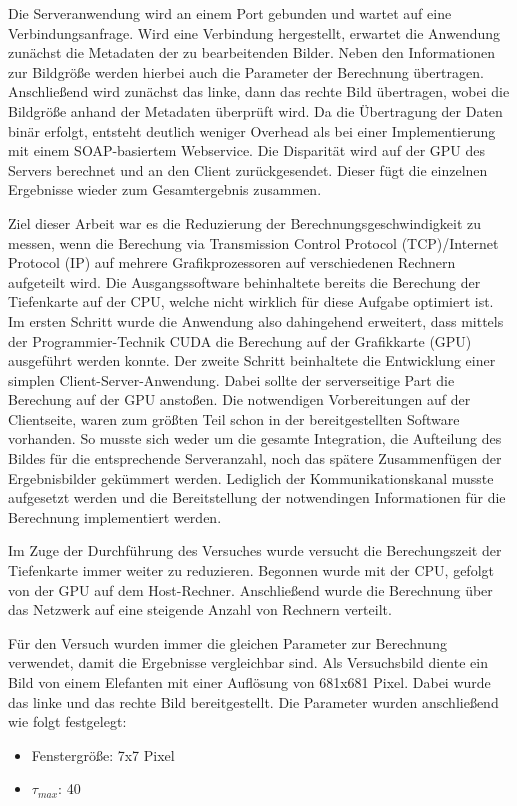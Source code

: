 \documentclass[times, 10pt,twocolumn]{article}
\begin{document}
Die Serveranwendung wird an einem Port gebunden und wartet auf eine Verbindungsanfrage. Wird eine Verbindung hergestellt, erwartet die Anwendung zunächst die Metadaten der zu bearbeitenden Bilder. Neben den Informationen zur Bildgröße werden hierbei auch die Parameter der Berechnung übertragen. Anschließend wird zunächst das linke, dann das rechte Bild übertragen, wobei die Bildgröße anhand der Metadaten überprüft wird. Da die Übertragung der Daten binär erfolgt, entsteht deutlich weniger Overhead als bei einer Implementierung mit einem SOAP-basiertem Webservice. Die Disparität wird auf der GPU des Servers berechnet und an den Client zurückgesendet. Dieser fügt die einzelnen Ergebnisse wieder zum Gesamtergebnis zusammen.



Ziel dieser Arbeit war es die Reduzierung der Berechnungsgeschwindigkeit zu messen, wenn die Berechung via Transmission Control Protocol (TCP)/Internet Protocol (IP) auf mehrere Grafikprozessoren auf verschiedenen Rechnern aufgeteilt wird.
Die Ausgangssoftware behinhaltete bereits die Berechung der Tiefenkarte auf der CPU, welche nicht wirklich für diese Aufgabe optimiert ist. Im ersten Schritt wurde die Anwendung also dahingehend erweitert, dass mittels der Programmier-Technik CUDA die Berechung auf der Grafikkarte (GPU) ausgeführt werden konnte.
Der zweite Schritt beinhaltete die Entwicklung einer simplen Client-Server-Anwendung. Dabei sollte der serverseitige Part die Berechung auf der GPU anstoßen. Die notwendigen Vorbereitungen auf der Clientseite, waren zum größten Teil schon in der bereitgestellten Software vorhanden. So musste sich weder um die gesamte Integration, die Aufteilung des Bildes für die entsprechende Serveranzahl, noch das spätere Zusammenfügen der Ergebnisbilder gekümmert werden. Lediglich der Kommunikationskanal musste aufgesetzt werden und die Bereitstellung der notwendingen Informationen für die Berechnung implementiert werden.

Im Zuge der Durchführung des Versuches wurde versucht die Berechungszeit der Tiefenkarte immer weiter zu reduzieren. Begonnen wurde mit der CPU, gefolgt von der GPU auf dem Host-Rechner. Anschließend wurde die Berechnung über das Netzwerk auf eine steigende Anzahl von Rechnern verteilt. 

Für den Versuch wurden immer die gleichen Parameter zur Berechnung verwendet, damit die Ergebnisse vergleichbar sind. Als Versuchsbild diente ein Bild von einem Elefanten mit einer Auflösung von 681x681 Pixel. Dabei wurde das linke und das rechte Bild bereitgestellt. Die Parameter wurden anschließend wie folgt festgelegt: 
\begin{itemize}
\setlength\itemsep{0.1px}
      \item Fenstergröße: 7x7 Pixel
      \item $\tau_{max}$: 40
\end{itemize}
\end{document}
